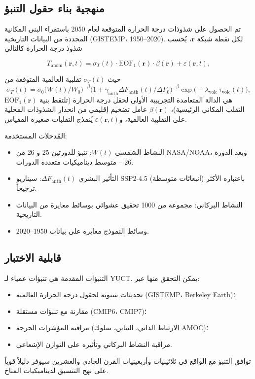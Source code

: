 \documentclass[11pt,a4paper]{article}
\begin{document}
	\subsection{منهجية بناء حقول التنبؤ}
	
	تم الحصول على شذوذات درجة الحرارة المتوقعة لعام 2050 باستقراء البنى المكانية المحددة من البيانات التاريخية (GISTEMP، 1950–2020). لكل نقطة شبكة \(\mathbf{r}\)، يُحسب شذوذ درجة الحرارة كالتالي
	
	\[
	T_{\mathrm{anom}}(\mathbf{r},t) = \sigma_T(t) \cdot \mathrm{EOF}_1(\mathbf{r}) \cdot \beta(\mathbf{r}) + \varepsilon(\mathbf{r},t),
	\]
	
	حيث \(\sigma_T(t)\) تقلبية العالمية المتوقعة من
	\[
	\sigma_T(t) = \sigma_0 \bigl( W(t)/W_0 \bigr)^{-\beta} \bigl(1 + \gamma_{\mathrm{anth}} \Delta F_{\mathrm{anth}}(t)/\Delta F_0\bigr)^{-\beta} \exp\!\bigl(-\lambda_{\text{volc}} \,\tau_{\text{volc}}(t)\bigr),
	\]
	\(\mathrm{EOF}_1(\mathbf{r})\) هي الدالة المتعامدة التجريبية الأولى لحقل درجة الحرارة (تلتقط بنية التقلب المكاني الرئيسية)، \(\beta(\mathbf{r})\) عامل تضخيم إقليمي من انحدار الشذوذات المحلية على التقلبية العالمية، و\(\varepsilon(\mathbf{r},t)\) يُنمذج التقلبات صغيرة المقياس.
	
	المُدخلات المستخدمة:
	\begin{itemize}
		\item النشاط الشمسي \(W(t)\): تنبؤ للدورتين 25 و 26 من NASA/NOAA، وبعد الدورة 26 – متوسط ديناميكيات متعددة الدورات.
		\item التأثير البشري \(\Delta F_{\mathrm{anth}}(t)\): سيناريو SSP2-4.5 (انبعاثات متوسطة) باعتباره الأكثر ترجيحاً.
		\item النشاط البركاني: مجموعة من 1000 تحقيق عشوائي بوسائط معايرة من البيانات التاريخية.
		\item وسائط النموذج معايرة على بيانات 1950–2020.
	\end{itemize}
	
	\subsection{قابلية الاختبار}
	
	التنبؤات المقدمة هي تنبؤات عمياء لـ YUCT. يمكن التحقق منها عبر:
	\begin{itemize}
		\item تحديثات سنوية لحقول درجة الحرارة العالمية (GISTEMP، Berkeley Earth)؛
		\item مقارنة مع تنبؤات مستقلة (CMIP6، CMIP7)؛
		\item مراقبة المؤشرات الحرجة (الارتباط الذاتي، التباين، سلوك AMOC)؛
		\item مراقبة النشاط البركاني وتأثيره على التوازن الإشعاعي.
	\end{itemize}
	توافق التنبؤ مع الواقع في ثلاثينيات وأربعينيات القرن الحادي والعشرين سيوفر دليلاً قوياً على نهج التنسيق لديناميكيات المناخ.
	
\end{document}
